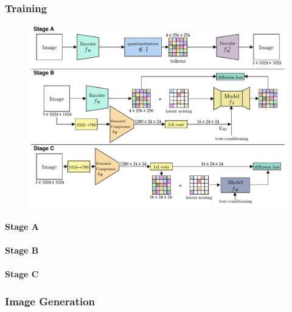 \subsubsection{Training}
\begin{figure}[t]
    \includegraphics[width=\textwidth]{assets/wuerstchen_training.pdf}
    \caption{}
    \label{fig:wuerstchen:training}
\end{figure}

\paragraph*{Stage A}

\paragraph*{Stage B}

\paragraph*{Stage C}

\subsubsection{Image Generation}